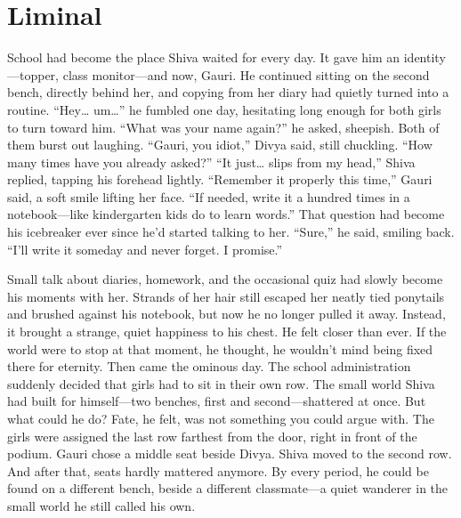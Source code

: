 \chapter{Liminal}
School had become the place Shiva waited for every day. It gave him an identity—topper, class monitor—and now, Gauri. He continued sitting on the second bench, directly behind her, and copying from her diary had quietly turned into a routine. ``Hey… um…'' he fumbled one day, hesitating long enough for both girls to turn toward him. ``What was your name again?'' he asked, sheepish. Both of them burst out laughing. ``Gauri, you idiot,'' Divya said, still chuckling. ``How many times have you already asked?'' ``It just… slips from my head,'' Shiva replied, tapping his forehead lightly. ``Remember it properly this time,'' Gauri said, a soft smile lifting her face. ``If needed, write it a hundred times in a notebook—like kindergarten kids do to learn words.'' That question had become his icebreaker ever since he'd started talking to her. ``Sure,'' he said, smiling back. ``I'll write it someday and never forget. I promise.''

Small talk about diaries, homework, and the occasional quiz had slowly become his moments with her. Strands of her hair still escaped her neatly tied ponytails and brushed against his notebook, but now he no longer pulled it away. Instead, it brought a strange, quiet happiness to his chest. He felt closer than ever. If the world were to stop at that moment, he thought, he wouldn't mind being fixed there for eternity. Then came the ominous day. The school administration suddenly decided that girls had to sit in their own row. The small world Shiva had built for himself—two benches, first and second—shattered at once. But what could he do? Fate, he felt, was not something you could argue with. The girls were assigned the last row farthest from the door, right in front of the podium. Gauri chose a middle seat beside Divya. Shiva moved to the second row. And after that, seats hardly mattered anymore. By every period, he could be found on a different bench, beside a different classmate—a quiet wanderer in the small world he still called his own.

